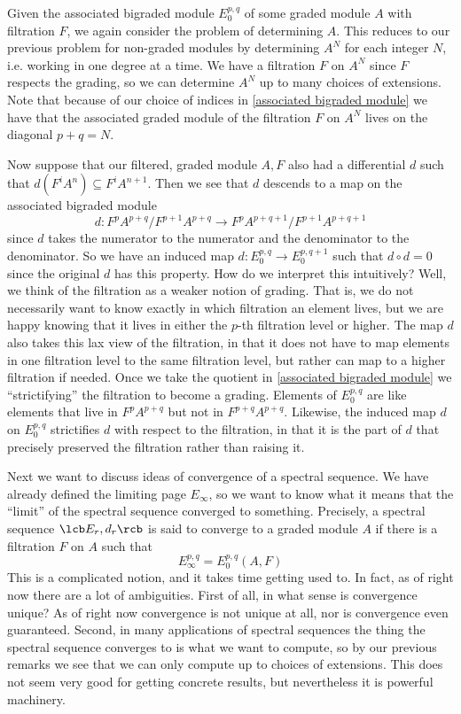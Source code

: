 Given the associated bigraded module $E_0^{p,q}$ of some graded module $A$ with filtration $F$, we again consider the problem of determining $A$. This reduces to our previous problem for non-graded modules by determining $A^N$ for each integer $N$, i.e. working in one degree at a time. We have a filtration $F$ on $A^N$ since $F$ respects the grading, so we can determine $A^N$ up to many choices of extensions. Note that because of our choice of indices in \eqref{associated bigraded module} we have that the associated graded module of the filtration $F$ on $A^N$ lives on the diagonal $p+q=N$. 

Now suppose that our filtered, graded module $A,F$ also had a differential $d$ such that $d(F^i A^n) \subseteq F^i A^{n+1}$. Then we see that $d$ descends to a map on the associated bigraded module
\[ d : F^p A^{p+q} / F^{p+1} A^{p+q} \rightarrow F^p A^{p+q+1} / F^{p+1} A^{p+q+1} \]
since $d$ takes the numerator to the numerator and the denominator to the denominator. So we have an induced map $d : E_0^{p,q} \rightarrow E_0^{p,q+1}$ such that $d \circ d = 0$ since the original $d$ has this property. How do we interpret this intuitively? Well, we think of the filtration as a weaker notion of grading. That is, we do not necessarily want to know exactly in which filtration an element lives, but we are happy knowing that it lives in either the $p$-th filtration level or higher. The map $d$ also takes this lax view of the filtration, in that it does not have to map elements in one filtration level to the same filtration level, but rather can map to a higher filtration if needed. Once we take the quotient in \ref{associated bigraded module} we ``strictifying'' the filtration to become a grading. Elements of $E_0^{p,q}$ are like elements that live in $F^p A^{p+q}$ but not in $F^{p+q} A^{p+q}$. Likewise, the induced map $d$ on $E_0^{p,q}$ strictifies $d$ with respect to the filtration, in that it is the part of $d$ that precisely preserved the filtration rather than raising it.

Next we want to discuss ideas of convergence of a spectral sequence. We have already defined the limiting page $E_\infty$, so we want to know what it means that the ``limit'' of the spectral sequence converged to something. Precisely, a spectral sequence $\lcb E_r,d_r \rcb$ is said to converge to a graded module $A$ if there is a filtration $F$ on $A$ such that
\[ E_\infty^{p,q} = E_0^{p,q}(A,F) \]
This is a complicated notion, and it takes time getting used to. In fact, as of right now there are a lot of ambiguities. First of all, in what sense is convergence unique? As of right now convergence is not unique at all, nor is convergence even guaranteed. Second, in many applications of spectral sequences the thing the spectral sequence converges to is what we want to compute, so by our previous remarks we see that we can only compute up to choices of extensions. This does not seem very good for getting concrete results, but nevertheless it is powerful machinery.

